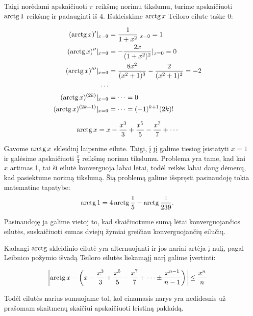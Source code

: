 Taigi norėdami apskaičiuoti $\pi$ reikšmę norimu tikslumu, turime 
apskaičiuoti $\mathop{\text{arctg}} 1$ reikšmę ir padauginti iš $4$. Išskleiskime
$\mathop{\text{arctg}} x$ Teiloro eilute taške $0$:

\begin{align*}
  (\arctg x)'|_{x=0} &= \frac{1}{1 + x^2}|_{x=0} = 1 \\
  (\arctg x)''|_{x=0} &= -\frac{2 x}{(1 + x^2)^2}|_{x=0} = 0 \\
  (\arctg x)'''|_{x=0} &=%
    \frac{8 x^2}{(x^2 + 1)^3} - \frac{2}{(x^2 + 1)^2} = -2 \\
  \cdots\\
  (\arctg x)^{(2k)}|_{x=0} &= \cdots = 0 \\
  (\arctg x)^{(2k+1)}|_{x=0} &= \cdots = (-1)^{k+1}(2k)! 
\end{align*}

\begin{equation}
  \arctg x = x - \frac{x^3}{3} + \frac{x^5}{5} - \frac{x^7}{7}%
    + \cdots
  \label{pi_2}
\end{equation}

Gavome $\mathop{\text{arctg}} x$ skleidinį laipsnine eilute. Taigi, į jį galime 
tiesiog įsistatyti $x = 1$ ir galėsime apskaičiuoti $\frac{\pi}{4}$ reikšmę
norimu tikslumu. Problema yra tame, kad kai $x$ artimas 1, tai ši
eilutė konverguoja labai lėtai, todėl reikės labai daug dėmenų, kad
pasiektume norimą tikslumą. Šią problemą galime išspręsti pasinaudoję
tokia matematine tapatybe\cite{fractal_pi}:
\begin{equation}
  \mathop{\text{arctg}} 1 = 4 \mathop{\text{arctg}} \frac{1}{5} - \mathop{\text{arctg}} \frac{1}{239}.
  \label{pi_3}
\end{equation}

Pasinaudoję ja galime vietoj to, kad skaičiuotume sumą lėtai 
konverguojančios eilutės, suskaičiuoti sumas dviejų žymiai greičiau
konverguojančių eilučių.

Kadangi $\mathop{\text{arctg}}$ skleidinio eilutė yra alternuojanti ir jos nariai artėja į
nulį, pagal Leibnico požymio išvadą Teiloro eilutės liekamąjį narį galime
įvertinti: 

\begin{equation}
  \left|\arctg x - \left(x - \frac{x^3}{3} + \frac{x^5}{5} - \frac{x^7}{7}%
    + \cdots \pm \frac{x^{n - 1}}{n - 1}\right) \right| \leq \frac{x^n}{n}
\end{equation}

Todėl eilutės narius sumuojame tol, kol einamasis narys yra nedidesnis už
prašomam skaitmenų skaičiui apskaičiuoti leistiną paklaidą.

